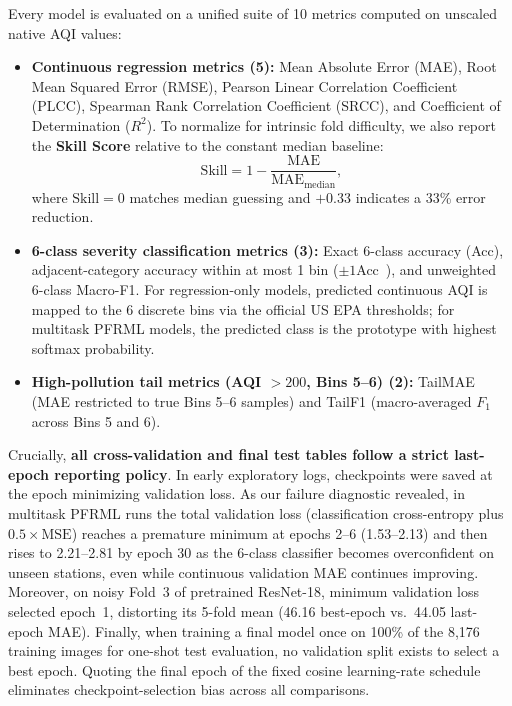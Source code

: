 \documentclass[conference]{IEEEtran}
\begin{document}
Every model is evaluated on a unified suite of 10 metrics computed on unscaled
native AQI values:
\begin{itemize}
  \item \textbf{Continuous regression metrics (5):} Mean Absolute Error (MAE),
        Root Mean Squared Error (RMSE), Pearson Linear Correlation Coefficient
        (PLCC), Spearman Rank Correlation Coefficient (SRCC), and Coefficient of
        Determination ($R^2$). To normalize for intrinsic fold difficulty, we
        also report the \textbf{Skill Score} relative to the constant median
        baseline:
        \begin{equation}
          \text{Skill}
          = 1 - \frac{\text{MAE}}{\text{MAE}_{\text{median}}}, \label{eq:skill}
        \end{equation}
        where $\text{Skill} = 0$ matches median guessing and $+0.33$ indicates a
        33\% error reduction.
  \item \textbf{6-class severity classification metrics (3):} Exact 6-class
        accuracy (Acc), adjacent-category accuracy within at most 1 bin
        ($\pm 1$Acc~\cite{nathvaniHereNowEvaluating2023}), and unweighted
        6-class Macro-F1. For regression-only models, predicted continuous AQI
        is mapped to the 6 discrete bins via the official US EPA thresholds; for
        multitask PFRML models, the predicted class is the prototype with
        highest softmax probability.
  \item \textbf{High-pollution tail metrics (AQI $> 200$, Bins 5--6) (2):}
        TailMAE (MAE restricted to true Bins 5--6 samples) and TailF1
        (macro-averaged $F_1$ across Bins 5 and 6).
\end{itemize}

Crucially, \textbf{all cross-validation and final test tables follow a strict
last-epoch reporting policy}. In early exploratory logs, checkpoints were saved
at the epoch minimizing validation loss. As our failure diagnostic revealed, in
multitask PFRML runs the total validation loss (classification cross-entropy
plus $0.5 \times \text{MSE}$) reaches a premature minimum at epochs 2--6
(1.53--2.13) and then rises to 2.21--2.81 by epoch 30 as the 6-class classifier
becomes overconfident on unseen stations, even while continuous validation MAE
continues improving. Moreover, on noisy Fold~3 of pretrained ResNet-18, minimum
validation loss selected epoch~1, distorting its 5-fold mean (46.16 best-epoch
vs.\ 44.05 last-epoch MAE). Finally, when training a final model once on 100\%
of the 8,176 training images for one-shot test evaluation, no validation split
exists to select a best epoch. Quoting the final epoch of the fixed cosine
learning-rate schedule eliminates checkpoint-selection bias across all
comparisons.
\end{document}
